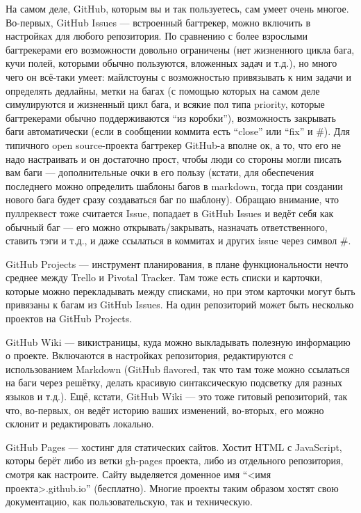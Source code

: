 \documentclass[a5paper]{article}
\begin{document}
На самом деле, GitHub, которым вы и так пользуетесь, сам умеет очень многое. Во-первых, GitHub Issues --- встроенный багтрекер, можно включить в настройках для любого репозитория. По сравнению с более взрослыми багтрекерами его возможности довольно ограничены (нет жизненного цикла бага, кучи полей, которыми обычно пользуются, вложенных задач и т.д.), но много чего он всё-таки умеет: майлстоуны с возможностью привязывать к ним задачи и определять дедлайны, метки на багах (с помощью которых на самом деле симулируются и жизненный цикл бага, и всякие пол типа priority, которые багтрекерами обычно поддерживаются ``из коробки''),  возможность закрывать баги автоматически (если в сообщении коммита есть ``close'' или ``fix'' и \#<номер бага>). Для типичного open source-проекта багтрекер GitHub-а вполне ок, а то, что его не надо настраивать и он достаточно прост, чтобы люди со стороны могли писать вам баги --- дополнительные очки в его пользу (кстати, для обеспечения последнего можно определить шаблоны багов в markdown, тогда при создании нового бага будет сразу создаваться баг по шаблону). Обращаю внимание, что пуллреквест тоже считается Issue, попадает в GitHub Issues и ведёт себя как обычный баг --- его можно открывать/закрывать, назначать ответственного, ставить тэги и т.д., и даже ссылаться в коммитах и других issue через символ \#.

GitHub Projects --- инструмент планирования, в плане функциональности нечто среднее между Trello и Pivotal Tracker. Там тоже есть списки и карточки, которые можно перекладывать между списками, но при этом карточки могут быть привязаны к багам из GitHub Issues. На один репозиторий может быть несколько проектов на GitHub Projects.

GitHub Wiki --- викистраницы, куда можно выкладывать полезную информацию о проекте. Включаются в настройках репозитория, редактируются с использованием Markdown (GitHub flavored, так что там тоже можно ссылаться на баги через решётку, делать красивую синтаксическую подсветку для разных языков и т.д.). Ещё, кстати, GitHub Wiki --- это тоже гитовый репозиторий, так что, во-первых, он ведёт историю ваших изменений, во-вторых, его можно склонит и редактировать локально.

GitHub Pages --- хостинг для статических сайтов. Хостит HTML с JavaScript, которы берёт либо из ветки gh-pages проекта, либо из отдельного репозитория, смотря как настроите. Сайту выделяется доменное имя ``<имя проекта>.github.io'' (бесплатно). Многие проекты таким образом хостят свою документацию, как пользовательскую, так и техническую. 
\end{document}
